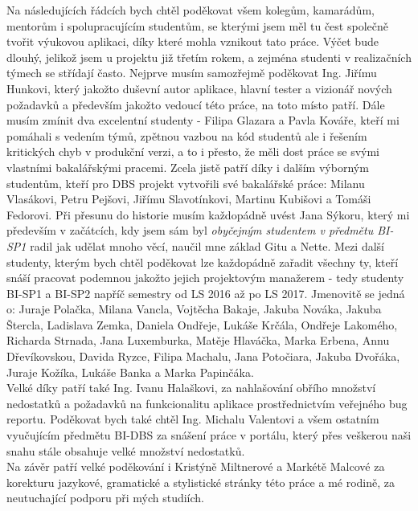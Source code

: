 Na následujících řádcích bych chtěl poděkovat všem kolegům, kamarádům, mentorům i spolupracujícím studentům, se kterými jsem měl tu čest společně tvořit výukovou aplikaci, díky které mohla vznikout tato práce. Výčet bude dlouhý, jelikož jsem u projektu již třetím rokem, a zejména studenti v realizačních týmech se střídají často. Nejprve musím samozřejmě poděkovat Ing. Jiřímu Hunkovi, který jakožto duševní autor aplikace, hlavní tester a vizionář nových požadavků a především jakožto vedoucí této práce, na toto místo patří. Dále musím zmínit dva excelentní studenty - Filipa Glazara a Pavla Kováře, kteří mi pomáhali s vedením týmů, zpětnou vazbou na kód studentů ale i řešením kritických chyb v produkční verzi, a to i přesto, že měli dost práce se svými vlastními bakalářskými pracemi. Zcela jistě patří díky i dalším výborným studentům, kteří pro DBS projekt vytvořili své bakalářské práce: Milanu Vlasákovi, Petru Pejšovi, Jiřímu Slavotínkovi, Martinu Kubišovi a Tomáši Fedorovi.
Při přesunu do historie musím každopádně uvést Jana Sýkoru, který mi především v začátcích, kdy jsem sám byl \emph{obyčejným studentem v předmětu BI-SP1} radil jak udělat mnoho věcí, naučil mne základ Gitu a Nette. Mezi další studenty, kterým bych chtěl poděkovat lze každopádně zařadit všechny ty, kteří snáší pracovat podemnou jakožto jejich projektovým manažerem - tedy studenty BI-SP1 a BI-SP2 napříč semestry od LS 2016 až po LS 2017. Jmenovitě se jedná o: Juraje Polačka, Milana Vancla, Vojtěcha Bakaje, Jakuba Nováka, Jakuba Štercla, Ladislava Zemka, Daniela Ondřeje, Lukáše Krčála, Ondřeje Lakomého, Richarda Strnada, Jana Luxemburka, Matěje Hlaváčka, Marka Erbena, Annu Dřevíkovskou, Davida Ryzce, Filipa Machalu, Jana Potočiara, Jakuba Dvořáka, Juraje Kožíka, Lukáše Banka a Marka Papinčáka.\\
Velké díky patří také Ing. Ivanu Halaškovi, za nahlašování obřího množství nedostatků a požadavků na funkcionalitu aplikace prostřednictvím veřejného bug reportu. Poděkovat bych také chtěl Ing. Michalu Valentovi a všem ostatním vyučujícím předmětu BI-DBS za snášení práce v portálu, který přes veškerou naši snahu stále obsahuje velké množství nedostatků.\\
Na závěr patří velké poděkování i Kristýně Miltnerové a Markétě Malcové za korekturu jazykové, gramatické a stylistické stránky této práce a mé rodině, za neutuchající podporu při mých studiích.